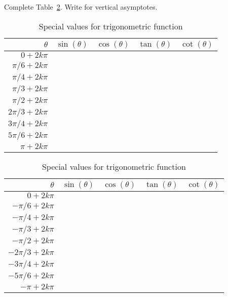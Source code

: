 \documentclass[../main.tex]{subfiles}
\begin{document}
\begin{exercise}
  Complete Table~\ref{table:trig-values}.  Write  for vertical asymptotes.



  \begin{table}[H]
    \begin{tabular}{r|p{1cm}|p{1cm}|p{1cm}|p{1cm}}
      \(\theta\) & \(\sin(\theta)\) & \(\cos(\theta)\) & \(\tan(\theta)\) & \(\cot(\theta)\) \\\toprule 
      \(    0 + 2k\pi\) &&& \\[2ex]\midrule\midrule
      \(\pi/6 + 2k\pi\) &&& \\[2ex]\midrule
      \(\pi/4 + 2k\pi\) &&& \\[2ex]\midrule
      \(\pi/3 + 2k\pi\) &&& \\[2ex]\midrule\midrule
      \(  \pi/2 + 2k\pi\) &&& \\[2ex]\midrule\midrule
      \(2\pi/3 + 2k\pi\) &&& \\[2ex]\midrule
      \(3\pi/4 + 2k\pi\) &&& \\[2ex]\midrule
      \(5\pi/6 + 2k\pi\) &&& \\[2ex]\midrule\midrule
      \(   \pi + 2k\pi\) &&& \\[2ex]
    \end{tabular}
    \quad
    \begin{tabular}{r|p{1cm}|p{1cm}|p{1cm}|p{1cm}}
      \(\theta\) & \(\sin(\theta)\) & \(\cos(\theta)\) & \(\tan(\theta)\) & \(\cot(\theta)\) \\\toprule 
      \(     0 + 2k\pi\) &&& \\[2ex]\midrule\midrule
      \(-\pi/6 + 2k\pi\) &&& \\[2ex]\midrule
      \(-\pi/4 + 2k\pi\) &&& \\[2ex]\midrule
      \(-\pi/3 + 2k\pi\) &&& \\[2ex]\midrule\midrule
      \( -\pi/2 + 2k\pi\) &&& \\[2ex]\midrule\midrule
      \(-2\pi/3 + 2k\pi\) &&& \\[2ex]\midrule
      \(-3\pi/4 + 2k\pi\) &&& \\[2ex]\midrule
      \(-5\pi/6 + 2k\pi\) &&& \\[2ex]\midrule
      \midrule
      \(   -\pi + 2k\pi\) &&& \\[2ex]
    \end{tabular}

    \caption{Special values for trigonometric function}
    \label{table:trig-values}
  \end{table}
\end{exercise}
\end{document}
